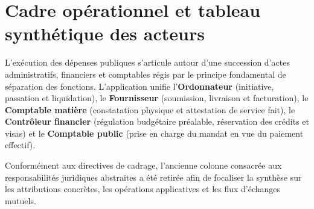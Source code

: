 \documentclass[11pt,a4paper]{article}
\begin{document}
\section{Cadre opérationnel et tableau synthétique des acteurs}

L'exécution des dépenses publiques s'articule autour d'une succession d'actes administratifs, financiers et comptables régis par le principe fondamental de séparation des fonctions. L'application unifie l'\textbf{Ordonnateur} (initiative, passation et liquidation), le \textbf{Fournisseur} (soumission, livraison et facturation), le \textbf{Comptable matière} (constatation physique et attestation de service fait), le \textbf{Contrôleur financier} (régulation budgétaire préalable, réservation des crédits et visas) et le \textbf{Comptable public} (prise en charge du mandat en vue du paiement effectif).

Conformément aux directives de cadrage, l'ancienne colonne consacrée aux responsabilités juridiques abstraites a été retirée afin de focaliser la synthèse sur les attributions concrètes, les opérations applicatives et les flux d'échanges mutuels.
\end{document}

